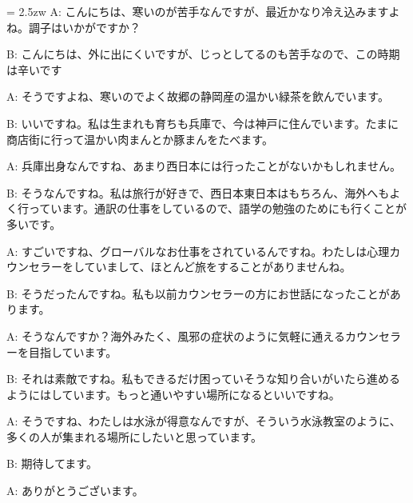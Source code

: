 \documentclass[11pt]{amsart}
\title{}
\author{}
\newenvironment{hangall}[1]{\hangindent = 2.5zw\everypar{\hangindent = 2.5zw}}{}
\begin{document}
\maketitle
\begin{hangall}{}%
A: こんにちは、寒いのが苦手なんですが、最近かなり冷え込みますよね。調子はいかがですか？

B: こんにちは、外に出にくいですが、じっとしてるのも苦手なので、この時期は辛いです

A: そうですよね、寒いのでよく故郷の静岡産の温かい緑茶を飲んでいます。

B: いいですね。私は生まれも育ちも兵庫で、今は神戸に住んでいます。たまに商店街に行って温かい肉まんとか豚まんをたべます。

A: 兵庫出身なんですね、あまり西日本には行ったことがないかもしれません。

B: そうなんですね。私は旅行が好きで、西日本東日本はもちろん、海外へもよく行っています。通訳の仕事をしているので、語学の勉強のためにも行くことが多いです。

A: すごいですね、グローバルなお仕事をされているんですね。わたしは心理カウンセラーをしていまして、ほとんど旅をすることがありませんね。

B: そうだったんですね。私も以前カウンセラーの方にお世話になったことがあります。

A: そうなんですか？海外みたく、風邪の症状のように気軽に通えるカウンセラーを目指しています。

B: それは素敵ですね。私もできるだけ困っていそうな知り合いがいたら進めるようにはしています。もっと通いやすい場所になるといいですね。

A: そうですね、わたしは水泳が得意なんですが、そういう水泳教室のように、多くの人が集まれる場所にしたいと思っています。

B: 期待してます。

A: ありがとうございます。
\end{hangall}
\end{document}
